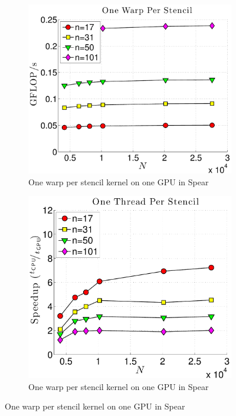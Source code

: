 \begin{figure}
\begin{subfigure}[t]{0.425\textwidth}
\includegraphics[width=1.0\textwidth]{../figures/spear_results/vortex/gflops_gpu_1proc_oneWarpPerStencil-eps-converted-to.pdf}
\caption{One warp per stencil kernel on one GPU in Spear}
\label{fig:alltoall_1proc_warp}
\end{subfigure} 
\begin{subfigure}[t]{0.425\textwidth}
\includegraphics[width=1.0\textwidth]{../figures/spear_results/vortex/speedup_1proc_oneThreadPerStencil-eps-converted-to.pdf}
\caption{One warp per stencil kernel on one GPU in Spear}
\label{fig:alltoall_1proc_warp}
\end{subfigure} 


\end{figure}
